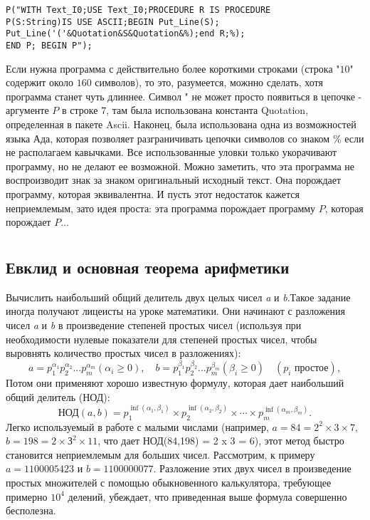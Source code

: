 \begin{lstlisting}[frame=none, mathescape=true, showstringspaces=false]
	P("WITH Text_I0;USE Text_I0;PROCEDURE R IS PROCEDURE
P(S:String)IS USE ASCII;BEGIN Put_Line(S);
Put_Line('('&Quotation&S&Quotation&%);end R;%);
END P; BEGIN P");
\end{lstlisting}

Если нужна программа с действительно более короткими строками \linebreak (строка "$10$" содержит около $160$ символов), то это, разумеется, можнно сделать, хотя программа станет чуть длиннее. Символ " не может просто появиться в цепочке - аргументе $P$ в строке $7$, там была использована константа Quotation, определенная в пакете Ascii. Наконец, была использована одна из возможностей языка Ада, которая позволяет разграничивать цепочки символов со знаком \% если не располагаем кавычками. Все использованные уловки только укорачивают программу, но не делают ее возможной. Можно заметить, что эта программа не воспроизводит знак за знаком оригинальный исходный текст. Она порождает программу, которая эквивалентна. И пусть этот недостаток кажется неприемлемым, зато идея проста: эта программа порождает программу $P$, которая порождает $P$...

\newpage
\chapter{}
\section{Евклид и основная теорема арифметики}
\noindent Вычислить наибольший общий делитель двух целых чисел {\it a} и {\it b}.Такое задание иногда получают лицеисты на уроке математики. Они начинают с разложения чисел {\it a} и {\it b} в произведение степеней простых чисел (используя при необходимости нулевые показатели для степеней простых чисел, чтобы выровнять количество простых чисел в разложениях): 
\[
 a=p_1^{\alpha_1}p_2^{\alpha_2}...p_m^{\alpha_m} (\alpha_i \geqslant 0), \quad b=p_1^{\beta_1}p_2^{\beta_2}...p_m^{\beta_m} (\beta_i \geqslant 0) \quad (p_i \text{ простое}),
\]
\noindent Потом они применяют хорошо известную формулу, которая дает наибольший общий делитель (НОД): 
\[
\text{НОД}(a,b)=p_1^{\inf (\alpha_1,\beta_1)} \times p_2^{\inf (\alpha_2,\beta_2)} \times \cdots \times p_m^{\inf (\alpha_m,\beta_m)}.
\]
Легко используемый в работе с малыми числами (например, $a = 84 = 2^2 \times 3 \times 7,$ \linebreak $b = 198 = 2 \times З^2 \times 11$, что дает НОД(84,198) = 2 x 3 = 6), этот метод быстро становится неприемлемым для больших чисел. Рассмотрим, к примеру $a = 1 100 005 423$ и $b = 1 100 000 077$. Разложение этих двух чисел в произведение простых множителей с помощью обыкновенного калькулятора, требующее примерно $10^4$ делений, убеждает, что приведенная выше формула совершенно бесполезна.

